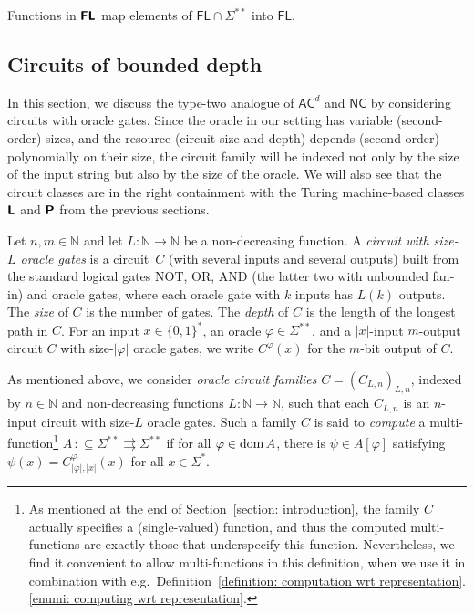 \documentclass[envcountsect,envcountsame,orivec,oribibl]{llncs}
\newcommand{\N}{\mathbb N}
\newcommand{\classonefont}[1]{\mathsf{#1}}
\newcommand{\classFL}{\classonefont{FL}}
\newcommand{\classNC}{\classonefont{NC}}
\newcommand{\classAC}{\classonefont{AC}}
\newcommand{\classtwofont}[1]{\text{\bfseries \sffamily \upshape #1}}
\newcommand{\classLtwo}{\classtwofont{L}}
\newcommand{\classFLtwo}{\classtwofont{FL}}
\newcommand{\classPtwo}{\classtwofont{P}}
\newcommand{\LM}{\varSigma ^{**}}
\newcommand{\dom}{\mathop{\rm dom}}
\newcommand{\OR}{\mathrm{OR}}
\newcommand{\NOT}{\mathrm{NOT}}
\newcommand{\AND}{\mathrm{AND}}
\newcommand{\pcolon}{\mathpunct{\,:\subseteq}}
\begin{document}
\begin{lemma}
\label{lemma:Ltwo-maps-L-to-L}
 Functions in $\classFLtwo$ map 
 elements of $\classFL \cap \LM$
 into $\classFL$.
\end{lemma}


\subsection{Circuits of bounded depth}

In this section, we discuss the type-two analogue of $\classAC ^d$ and $\classNC$ 
by considering circuits with oracle gates.
Since the oracle in our setting has variable (second-order) sizes, 
and the resource (circuit size and depth) 
depends (second-order) polynomially on their size, 
the circuit family will be 
indexed not only by the size of the input string
but also by the size of the oracle. 
We will also see that the circuit classes are 
in the right containment with the 
Turing machine-based classes $\classLtwo$ and $\classPtwo$
from the previous sections. 

Let $n, m \in \N$ and let $L \colon \N \to \N$ be a non-decreasing function.
A \emph{circuit with size-$L$ oracle gates} is a circuit~$C$ 
(with several inputs and several outputs)
built from
the standard logical gates $\NOT$, $\OR$, $\AND$ (the latter two with unbounded fan-in) 
and oracle gates, 
where each oracle gate with $k$ inputs has $L (k)$ outputs.
The \emph{size} of $C$ is the number of gates.
The \emph{depth} of $C$ is the length of the longest path in $C$.
For an input $x \in \{0, 1\} ^*$, an oracle $\varphi \in \LM$, 
and a $|x|$-input $m$-output circuit $C$ with size-$|\varphi|$ oracle gates, 
we write $C^\varphi(x)$ for the $m$-bit output of $C$.

As mentioned above,
we consider \emph{oracle circuit families} $C = (C_{L,n})_{L,n}$, 
indexed by $n \in \N$ and non-decreasing functions $L \colon \N \to \N$,
such that each $C_{L, n}$ is an $n$-input circuit with size-$L$ oracle gates.
Such a family $C$ is said to
\emph{compute} a multi-function\footnote{%
As mentioned at the end of Section~\ref{section: introduction}, 
the family $C$ actually specifies a (single-valued) function, 
and thus the computed multi-functions are 
exactly those that underspecify this function. 
Nevertheless, we find it convenient to 
allow multi-functions in this definition, 
when we use it in combination with e.g.\ 
Definition~\ref{definition: computation wrt representation}.\ref{enumi: computing wrt representation}.
}
$A \pcolon \LM \rightrightarrows \LM$ if 
for all $\varphi \in \dom A$, there is $\psi \in A[\varphi]$ 
satisfying $\psi(x) = C_{|\varphi|, |x|}^\varphi(x)$ for all $x \in \varSigma^*$.
\end{document}
